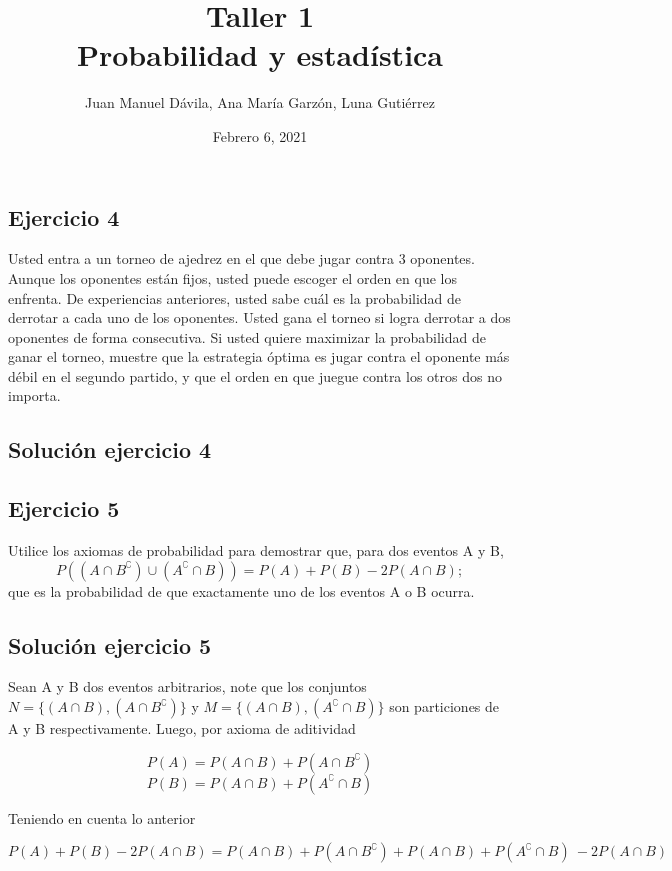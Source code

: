 \documentclass{homeworg}
\title{Taller 1 
\\Probabilidad y estadística}
\author{Juan Manuel Dávila, Ana María Garzón, Luna Gutiérrez}
\date{Febrero 6, 2021}
\begin{document}
\maketitle

\subsection*{Ejercicio 4}
Usted entra a un torneo de ajedrez en el que debe jugar contra 3 oponentes. Aunque los oponentes están fijos, usted puede escoger el orden en que los enfrenta. De experiencias anteriores, usted sabe cuál es la probabilidad de derrotar a cada uno de los oponentes. Usted gana el torneo si logra derrotar a dos oponentes de forma consecutiva. Si usted quiere maximizar la probabilidad de ganar el torneo, muestre que la estrategia óptima es jugar contra el oponente más débil en el segundo partido, y que el orden en que juegue contra los otros dos no importa.

\subsection*{Solución ejercicio 4}



\bigskip\bigskip

\subsection*{Ejercicio 5}
Utilice los axiomas de probabilidad para demostrar que, para dos eventos A y B,
\[P((A \cap B^\complement) \cup (A^\complement \cap B)) = P(A) + P(B) - 2P(A \cap B);\]
que es la probabilidad de que exactamente uno de los eventos A o B ocurra.

\subsection*{Solución ejercicio 5}

Sean A y B dos eventos arbitrarios, note que los conjuntos $ N = \{ (A \cap B) , (A \cap B^\complement) \}$ y $ M = \{ (A \cap B)  , (A^\complement \cap B) \}$ son particiones de A y B respectivamente. Luego, por axioma de aditividad

\[P(A) = P(A \cap B) + P(A \cap B^\complement)\]
\[P(B) = P(A \cap B) + P(A^\complement \cap B)\]

Teniendo en cuenta lo anterior

\[P(A) + P(B) - 2P(A \cap B) = P(A \cap B) + P(A \cap B^\complement) + P(A \cap B) + P(A^\complement \cap B)\ - 2P(A \cap B)\]
\end{document}
